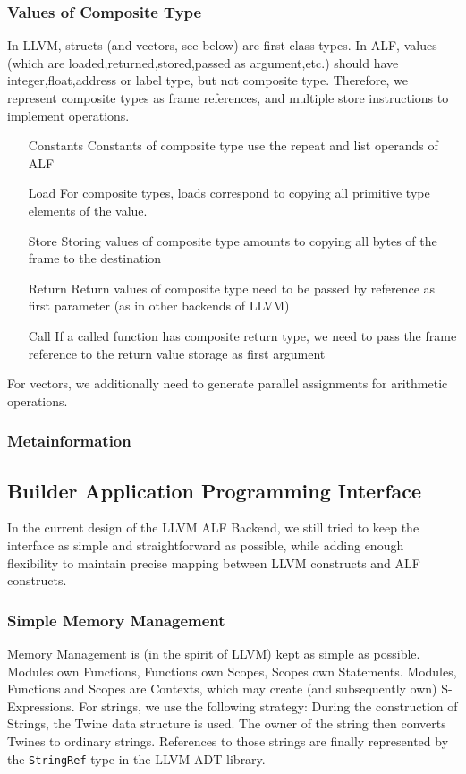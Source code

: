 \subsubsection{Values of Composite Type}
In LLVM, structs (and vectors, see below) are first-class types.
In ALF, values (which are loaded,returned,stored,passed as argument,etc.) should
have integer,float,address or label type, but not composite type.
Therefore, we represent composite types as frame references, and multiple store
instructions to implement operations.
\begin{itemize}
\item[Constants] Constants of composite type use the repeat and list operands
of ALF
\item[Load] For composite types, loads correspond to copying all primitive type
elements of the value.
\item[Store] Storing values of composite type amounts to copying all bytes of
the frame to the destination
\item[Return] Return values of composite type need to be passed by reference
as first parameter (as in other backends of LLVM)
\item[Call] If a called function has composite return type, we need to pass the
frame reference to the return value storage as first argument
\end{itemize}
For vectors, we additionally need to generate parallel assignments for arithmetic
operations.

\subsubsection{Metainformation}

\subsection{Builder Application Programming Interface}
In the current design of the LLVM ALF Backend, we still tried to keep
the interface as simple and straightforward as possible, while adding
enough flexibility to maintain precise mapping between LLVM constructs
and ALF constructs.

\subsubsection{Simple Memory Management}
Memory Management is (in the spirit of LLVM) kept as simple as possible. Modules
own Functions, Functions own Scopes, Scopes own Statements. Modules, Functions
and Scopes are Contexts, which may create (and subsequently own) S-Expressions.
For strings, we use the following strategy: During the construction of Strings,
the Twine data structure is used. The owner of the string then converts Twines
to ordinary strings. References to those strings are finally represented by the
\texttt{StringRef} type in the LLVM ADT library.

